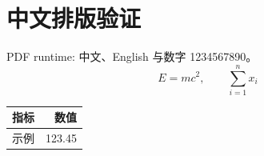 \documentclass[UTF8,fontset=fandol]{ctexart}
\begin{document}
\section{中文排版验证}
PDF runtime: 中文、English 与数字 1234567890。
\[
 E=mc^2,\qquad \sum_{i=1}^{n} x_i
\]
\begin{tabular}{lr}
\toprule 指标 & 数值 \\ \midrule 示例 & 123.45 \\ \bottomrule
\end{tabular}
\end{document}
